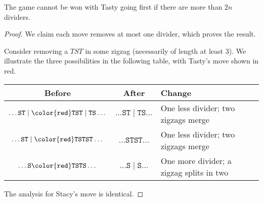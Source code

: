 \begin{claim*}
  The game cannot be won with Tasty going first
  if there are more than $2n$ dividers.
\end{claim*}
\begin{proof}
  We claim each move removes at most one divider,
  which proves the result.

  Consider removing a $TST$ in some zigzag
  (necessarily of length at least $3$).
  We illustrate the three possibilities in the following table,
  with Tasty's move shown in red.
  \begin{center}
  \begin{tabular}{ccl}
    Before & After & Change \\ \hline
    $\dots \mathtt{ST} \mid \mathtt{\color{red} TST}
      \mid \mathtt{TS}\dots$
      & $\dots \mathtt{ST} \mid \mathtt{TS} \dots$
      & One less divider; two zigzags merge \\
    $\dots \mathtt{ST} \mid \mathtt{\color{red} TST}
      \mathtt{ST}\dots$
      & $\dots \mathtt{STST} \dots$
      & One less divider; two zigzags merge \\
    $\dots \mathtt{S} \mathtt{\color{red} TST} \mathtt{S} \dots$
      & $\dots \mathtt{S} \mid \mathtt{S} \dots$
      & One more divider; a zigzag splits in two
  \end{tabular}
  \end{center}
  The analysis for Stacy's move is identical.
\end{proof}


